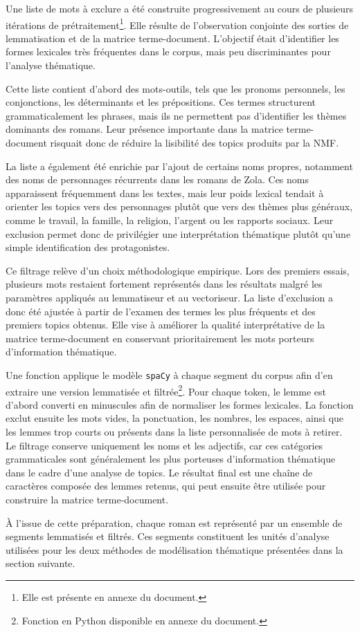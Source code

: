 Une liste de mots à exclure a été construite progressivement au cours de plusieurs itérations de prétraitement\footnote{Elle est présente en annexe du document.}. Elle résulte de l'observation conjointe des sorties de lemmatisation et de la matrice terme-document. L'objectif était d'identifier les formes lexicales très fréquentes dans le corpus, mais peu discriminantes pour l'analyse thématique.

Cette liste contient d'abord des mots-outils, tels que les pronoms personnels, les conjonctions, les déterminants et les prépositions. Ces termes structurent grammaticalement les phrases, mais ils ne permettent pas d'identifier les thèmes dominants des romans. Leur présence importante dans la matrice terme-document risquait donc de réduire la lisibilité des topics produits par la NMF.

La liste a également été enrichie par l'ajout de certains noms propres, notamment des noms de personnages récurrents dans les romans de Zola. Ces noms apparaissent fréquemment dans les textes, mais leur poids lexical tendait à orienter les topics vers des personnages plutôt que vers des thèmes plus généraux, comme le travail, la famille, la religion, l'argent ou les rapports sociaux. Leur exclusion permet donc de privilégier une interprétation thématique plutôt qu'une simple identification des protagonistes.

Ce filtrage relève d'un choix méthodologique empirique. Lors des premiers essais, plusieurs mots restaient fortement représentés dans les résultats malgré les paramètres appliqués au lemmatiseur et au vectoriseur. La liste d'exclusion a donc été ajustée à partir de l'examen des termes les plus fréquents et des premiers topics obtenus. Elle vise à améliorer la qualité interprétative de la matrice terme-document en conservant prioritairement les mots porteurs d'information thématique.

Une fonction applique le modèle \texttt{spaCy} à chaque segment du corpus afin d'en extraire une version lemmatisée et filtrée\footnote{Fonction en Python disponible en annexe du document.}. Pour chaque token, le lemme est d'abord converti en minuscules afin de normaliser les formes lexicales. La fonction exclut ensuite les mots vides, la ponctuation, les nombres, les espaces, ainsi que les lemmes trop courts ou présents dans la liste personnalisée de mots à retirer. Le filtrage conserve uniquement les noms et les adjectifs, car ces catégories grammaticales sont généralement les plus porteuses d'information thématique dans le cadre d'une analyse de topics. Le résultat final est une chaîne de caractères composée des lemmes retenus, qui peut ensuite être utilisée pour construire la matrice terme-document.

À l'issue de cette préparation, chaque roman est représenté par un ensemble de segments lemmatisés et filtrés. Ces segments constituent les unités d'analyse utilisées pour les deux méthodes de modélisation thématique présentées dans la section suivante.
